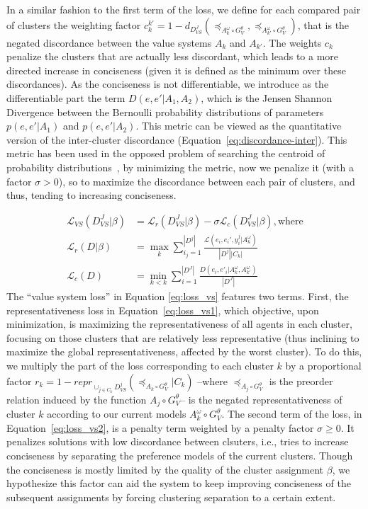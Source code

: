 \documentclass{ecai}
\newcommand{\abs}[1]{{\left|#1\right|}}
\begin{document}
In a similar fashion to the first term of the loss, we define for each compared pair of clusters the weighting factor $c_k^{k'} = 1-d_{D_{VS}^{J}}(\preccurlyeq_{A_k^\omega \circ G_V^\theta},\preccurlyeq_{A_{k'}^\omega\circ G_V^\theta})$, that is the negated discordance between the value systems $A_k$ and $A_{k'}$. The weights $c_k$ penalize the clusters that are actually less discordant, which leads to a more directed increase in conciseness (given it is defined as the minimum over these discordances). As the conciseness is not differentiable, we introduce as the differentiable part the term $D(e,e'|A_1,A_2)$, which is the Jensen Shannon Divergence between the Bernoulli probability distributions of parameters $p(e,e'|A_1)$ and $p(e,e'|A_2)$. This metric can be viewed as the quantitative version of the inter-cluster discordance (Equation~\ref{eq:discordance-inter}). This metric has been used in the opposed problem of searching the centroid of probability distributions~\cite{jensenfordistancebetweenprobscentroid}, by minimizing the metric, now we penalize it (with a factor $\sigma>0$), so to maximize the discordance between each pair of clusters, and thus, tending to increasing conciseness. 

\fi

\begin{align}\label{eq:loss_vs}
    \mathcal{L}_{VS}(D_{VS}^J|\beta) &= \mathcal{L}_{r}(D_{VS}^J|\beta) - \sigma\mathcal{L}_{c}(D_{VS}^J|\beta),\text{where} \\
    \label{eq:loss_vs1}\mathcal{L}_r(D|\beta) &=\max_{k}\sum_{i_j=1}^{\abs{D^j}}\frac{\mathcal{L}(e_i,e_i',y_i^j|A_k^\omega)}{\abs{D^j}\abs{C_k}}\\
    \label{eq:loss_vs2}\mathcal{L}_c(D) &=\min_{k < k} \sum_{i=1}^{\abs{D^J}}\frac{D(e_i,e'_i|A_k^\omega,A_{k'}^\omega)}{{\abs{D^J}}}
\end{align}
The ``value system loss'' in Equation \ref{eq:loss_vs} features two terms. First, the representativeness loss in Equation~\ref{eq:loss_vs1}, which objective, upon minimization, is maximizing the representativeness of all agents in each cluster, focusing on those clusters that are relatively less representative (thus inclining to maximize the global representativeness, affected by the worst cluster). To do this, we multiply the part of the loss corresponding to each cluster $k$ by a proportional factor $r_k = 1-repr_{\cup_{j\in C_k}D_{VS}^j}\left(\preccurlyeq_{A_k \circ G^\theta_V}|C_k\right)$ --where $\preccurlyeq_{A_j \circ G^\theta_V}$ is the preorder relation induced by the function $A_j \circ G^\theta_V$-- is the negated representativeness of cluster $k$ according to our current models $A^\omega_k\circ G^\theta_V$. The second term of the loss, in Equation~\ref{eq:loss_vs2}, is a penalty term weighted by a penalty factor $\sigma \geq 0$. It penalizes solutions with low discordance between clsuters, i.e., tries to increase conciseness by separating the preference models of the current clusters. Though the conciseness is mostly limited by the quality of the cluster assignment $\beta$, we hypothesize this factor can aid the system to keep improving conciseness of the subsequent assignments by forcing clustering separation to a certain extent. 
\end{document}
